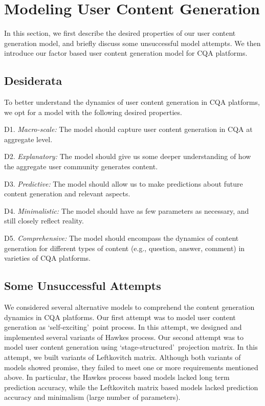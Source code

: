 \newpage
\section{Modeling User Content Generation}
In this section, we first describe the desired properties of our user content generation model, and briefly discuss some unsuccessful model attempts. We then introduce our factor based user content generation model for CQA platforms.

\subsection{Desiderata} 
To better understand the dynamics of user content generation in CQA platforms, we opt for a model with the following desired properties.

D1. \textit{Macro-scale:} The model should capture user content generation in CQA at aggregate level. 

D2. \textit{Explanatory:} The model should give us some deeper understanding of how the aggregate user community generates content.

D3. \textit{Predictive:} The model should allow us to make predictions about future content generation and relevant aspects.

D4. \textit{Minimalistic:} The model should have as few parameters as necessary, and still closely reflect reality.

D5. \textit{Comprehensive:} The model should encompass the dynamics of content generation for different types of content (e.g., question, answer, comment) in varieties of CQA platforms.

\subsection{Some Unsuccessful Attempts} 
We considered several alternative models to comprehend the content generation dynamics in CQA platforms. Our first attempt was to model user content generation as \lq self-exciting\rq\ point process. In this attempt, we designed and implemented several variants of Hawkes process. Our second attempt was to model user content generation using \lq stage-structured\rq\ projection matrix. In this attempt, we built variants of Leftkovitch matrix. Although both variants of models showed promise, they failed to meet one or more requirements mentioned above. In particular, the Hawkes process based models lacked long term prediction accuracy, while the Leftkovitch matrix based models lacked prediction accuracy and minimalism (large number of parameters). 

